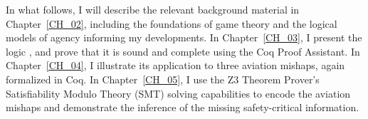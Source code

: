  

In what follows, I will describe the relevant background material in Chapter~\ref{CH_02}, including the foundations of game theory and the logical models of agency informing my developments. In Chapter~\ref{CH_03}, I present the logic \DASL, and prove that it is sound and complete using the Coq Proof Assistant. In Chapter~\ref{CH_04}, I illustrate its application to three aviation mishaps, again formalized in Coq. In Chapter~\ref{CH_05}, I use the Z3 Theorem Prover's Satisfiability Modulo Theory (SMT) solving capabilities to encode the aviation mishaps and demonstrate the inference of the missing safety-critical information.
